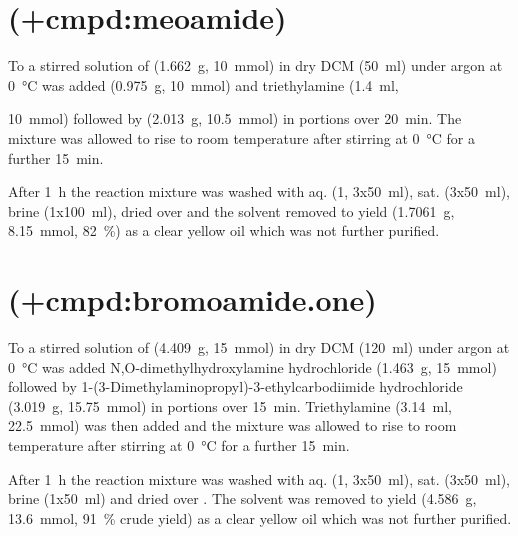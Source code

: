 
\section{ (\cmpd+{cmpd:meoamide})}

To a stirred solution of  (\SI{1.662}{\gram}, \SI{10}{\milli\mol}) in dry DCM (\SI{50}{\milli\litre}) under argon at \SI{0}{\celsius} was added  (\SI{0.975}{\gram}, \SI{10}{\milli\mol}) and triethylamine (\SI{1.4}{\milli\litre}, {\SI{10}{\milli\mol}) followed by  (\SI{2.013}{\gram}, \SI{10.5}{\milli\mol}) in portions over \SI{20}{\minute}. The mixture was allowed to rise to room temperature after stirring at \SI{0}{\celsius} for a further \SI{15}{\minute}.

After \SI{1}{\hour} the reaction mixture was washed with aq.  (\SI{1}{\Molar}, 3x\SI{50}{\milli\litre}), sat.  (3x\SI{50}{\milli\litre}), brine (1x\SI{100}{\milli\litre}), dried over  and the solvent removed \invacuo to yield  (\SI{1.7061}{\gram}, \SI{8.15}{\milli\mole}, \SI{82}{\percent}) as a clear yellow oil which was not further purified.


\section{ (\cmpd+{cmpd:bromoamide.one})}

To a stirred solution of  (\SI{4.409}{\gram}, \SI{15}{\milli\mol}) in dry DCM (\SI{120}{\milli\litre}) under argon at \SI{0}{\celsius} was added N,O-dimethylhydroxylamine hydrochloride (\SI{1.463}{\gram}, \SI{15}{\milli\mol}) followed by 1-(3-Dimethylaminopropyl)-3-ethylcarbodiimide hydrochloride (\SI{3.019}{\gram}, \SI{15.75}{\milli\mol}) in portions over \SI{15}{\minute}. Triethylamine (\SI{3.14}{\milli\litre}, \SI{22.5}{\milli\mol}) was then added and the mixture was allowed to rise to room temperature after stirring at \SI{0}{\celsius} for a further \SI{15}{\minute}.

After \SI{1}{\hour} the reaction mixture was washed with aq.  (\SI{1}{\Molar}, 3x\SI{50}{\milli\litre}), sat.  (3x\SI{50}{\milli\litre}), brine (1x\SI{50}{\milli\litre}) and dried over . The solvent was removed \invacuo to yield  (\SI{4.586}{\gram}, \SI{13.6}{\milli\mol}, \SI{91}{\percent} crude yield) as a clear yellow oil which was not further purified.

}
